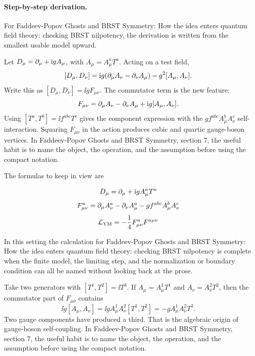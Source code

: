 \paragraph{Step-by-step derivation.}

For Faddeev-Popov Ghosts and BRST Symmetry: How the idea enters quantum field theory: checking BRST nilpotency, the derivation is written from the smallest usable model upward.

Let \(D_\mu=\partial_\mu+\mathrm i gA_\mu\), with \(A_\mu=A_\mu^aT^a\).  Acting on a test field,
\[
  [D_\mu,D_\nu]
  =
  \mathrm i g(\partial_\mu A_\nu-\partial_\nu A_\mu)-g^2[A_\mu,A_\nu].
\]
Write this as \([D_\mu,D_\nu]=\ii gF_{\mu\nu}\).  The commutator term is the new feature:
\[
  F_{\mu\nu}=\partial_\mu A_\nu-\partial_\nu A_\mu+\mathrm i g[A_\mu,A_\nu].
\]
Using \([T^a,T^b]=\ii f^{abc}T^c\) gives the component expression with the \(gf^{abc}A_\mu^bA_\nu^c\) self-interaction.  Squaring \(F_{\mu\nu}\) in the action produces cubic and quartic gauge-boson vertices.  In Faddeev-Popov Ghosts and BRST Symmetry, section 7, the useful habit is to name the object, the operation, and the assumption before using the compact notation.

The formulas to keep in view are

\[
  D_\mu=\partial_\mu+\mathrm i gA_\mu^aT^a
\]
\[
  F_{\mu\nu}^a=\partial_\mu A_\nu^a-\partial_\nu A_\mu^a-gf^{abc}A_\mu^bA_\nu^c
\]
\[
  \mathcal L_{\mathrm{YM}}=-\frac14F_{\mu\nu}^aF^{a\mu\nu}
\]

In this setting the calculation for Faddeev-Popov Ghosts and BRST Symmetry: How the idea enters quantum field theory: checking BRST nilpotency is complete when the finite model, the limiting step, and the normalization or boundary condition can all be named without looking back at the prose.




\begin{example}
Take two generators with \([T^1,T^2]=\ii T^3\).  If \(A_\mu=A_\mu^1T^1\) and \(A_\nu=A_\nu^2T^2\), then the commutator part of \(F_{\mu\nu}\) contains
\[
  \ii g[A_\mu,A_\nu]=\ii gA_\mu^1A_\nu^2[T^1,T^2]=-gA_\mu^1A_\nu^2T^3.
\]
Two gauge components have produced a third.  That is the algebraic origin of gauge-boson self-coupling.  In Faddeev-Popov Ghosts and BRST Symmetry, section 7, the useful habit is to name the object, the operation, and the assumption before using the compact notation.
\end{example}



